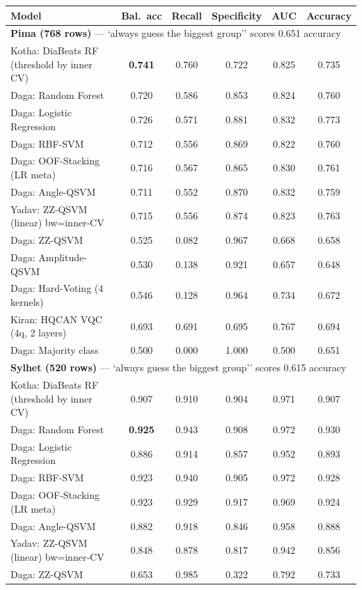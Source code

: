 \begin{tabular}{lccccc}
\toprule Model & Bal.\ acc & Recall & Specificity & AUC & Accuracy\\\midrule
\multicolumn{6}{l}{\textbf{Pima (768 rows)} --- `always guess the biggest group'' scores 0.651 accuracy}\\
Kotha: DiaBeats RF (threshold by inner CV) & \textbf{0.741} & 0.760 & 0.722 & 0.825 & 0.735\\
Daga: Random Forest & 0.720 & 0.586 & 0.853 & 0.824 & 0.760\\
Daga: Logistic Regression & 0.726 & 0.571 & 0.881 & 0.832 & 0.773\\
Daga: RBF-SVM & 0.712 & 0.556 & 0.869 & 0.822 & 0.760\\
Daga: OOF-Stacking (LR meta) & 0.716 & 0.567 & 0.865 & 0.830 & 0.761\\
Daga: Angle-QSVM & 0.711 & 0.552 & 0.870 & 0.832 & 0.759\\
Yadav: ZZ-QSVM (linear) bw=inner-CV & 0.715 & 0.556 & 0.874 & 0.823 & 0.763\\
Daga: ZZ-QSVM & 0.525 & 0.082 & 0.967 & 0.668 & 0.658\\
Daga: Amplitude-QSVM & 0.530 & 0.138 & 0.921 & 0.657 & 0.648\\
Daga: Hard-Voting (4 kernels) & 0.546 & 0.128 & 0.964 & 0.734 & 0.672\\
Kiran: HQCAN VQC (4q, 2 layers) & 0.693 & 0.691 & 0.695 & 0.767 & 0.694\\
Daga: Majority class & 0.500 & 0.000 & 1.000 & 0.500 & 0.651\\
\midrule\multicolumn{6}{l}{\textbf{Sylhet (520 rows)} --- `always guess the biggest group'' scores 0.615 accuracy}\\
Kotha: DiaBeats RF (threshold by inner CV) & 0.907 & 0.910 & 0.904 & 0.971 & 0.907\\
Daga: Random Forest & \textbf{0.925} & 0.943 & 0.908 & 0.972 & 0.930\\
Daga: Logistic Regression & 0.886 & 0.914 & 0.857 & 0.952 & 0.893\\
Daga: RBF-SVM & 0.923 & 0.940 & 0.905 & 0.972 & 0.928\\
Daga: OOF-Stacking (LR meta) & 0.923 & 0.929 & 0.917 & 0.969 & 0.924\\
Daga: Angle-QSVM & 0.882 & 0.918 & 0.846 & 0.958 & 0.888\\
Yadav: ZZ-QSVM (linear) bw=inner-CV & 0.848 & 0.878 & 0.817 & 0.942 & 0.856\\
Daga: ZZ-QSVM & 0.653 & 0.985 & 0.322 & 0.792 & 0.733\\

\end{tabular}
